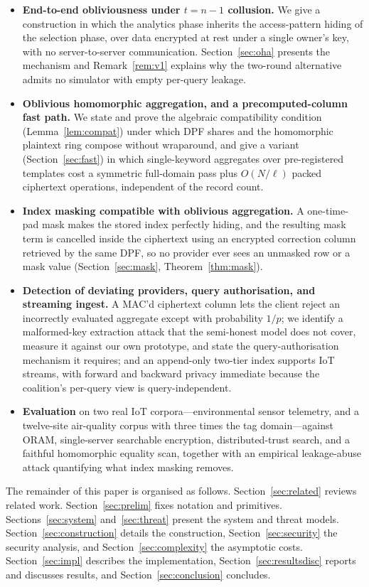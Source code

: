 \documentclass[journal]{IEEEtran}
\begin{document}
\begin{itemize}
\item \textbf{End-to-end obliviousness under $t=n-1$ collusion.} We give a construction in which the analytics phase inherits the access-pattern hiding of the selection phase, over data encrypted at rest under a single owner's key, with no server-to-server communication. Section~\ref{sec:oha} presents the mechanism and Remark~\ref{rem:v1} explains why the two-round alternative admits no simulator with empty per-query leakage.
\item \textbf{Oblivious homomorphic aggregation, and a precomputed-column fast path.} We state and prove the algebraic compatibility condition (Lemma~\ref{lem:compat}) under which DPF shares and the homomorphic plaintext ring compose without wraparound, and give a variant (Section~\ref{sec:fast}) in which single-keyword aggregates over pre-registered templates cost a symmetric full-domain pass plus $O(N/\ell)$ packed ciphertext operations, independent of the record count.
\item \textbf{Index masking compatible with oblivious aggregation.} A one-time-pad mask makes the stored index perfectly hiding, and the resulting mask term is cancelled inside the ciphertext using an encrypted correction column retrieved by the same DPF, so no provider ever sees an unmasked row or a mask value (Section~\ref{sec:mask}, Theorem~\ref{thm:mask}).
\item \textbf{Detection of deviating providers, query authorisation, and streaming ingest.} A MAC'd ciphertext column lets the client reject an incorrectly evaluated aggregate except with probability $1/p$; we identify a malformed-key extraction attack that the semi-honest model does not cover, measure it against our own prototype, and state the query-authorisation mechanism it requires; and an append-only two-tier index supports IoT streams, with forward and backward privacy immediate because the coalition's per-query view is query-independent.
\item \textbf{Evaluation} on two real IoT corpora---environmental sensor telemetry, and a twelve-site air-quality corpus with three times the tag domain---against ORAM, single-server searchable encryption, distributed-trust search, and a faithful homomorphic equality scan, together with an empirical leakage-abuse attack quantifying what index masking removes.
\end{itemize}

The remainder of this paper is organised as follows. Section~\ref{sec:related} reviews related work. Section~\ref{sec:prelim} fixes notation and primitives. Sections~\ref{sec:system} and~\ref{sec:threat} present the system and threat models. Section~\ref{sec:construction} details the construction, Section~\ref{sec:security} the security analysis, and Section~\ref{sec:complexity} the asymptotic costs. Section~\ref{sec:impl} describes the implementation, Section~\ref{sec:resultsdisc} reports and discusses results, and Section~\ref{sec:conclusion} concludes.
\end{document}
